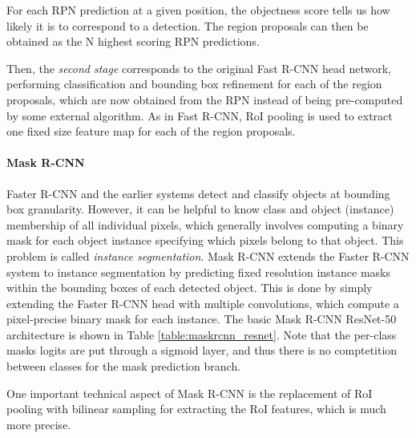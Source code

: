 For each RPN prediction at a given position, the objectness score tells us how likely it is to correspond to a detection.
The region proposals can then be obtained as the N highest scoring RPN predictions.

Then, the \emph{second stage} corresponds to the original Fast R-CNN head network, performing classification
and bounding box refinement for each of the region proposals, which are now obtained
from the RPN instead of being pre-computed by some external algorithm.
As in Fast R-CNN, RoI pooling is used to extract one fixed size feature map for each of the region proposals.

\paragraph{Mask R-CNN}
Faster R-CNN and the earlier systems detect and classify objects at bounding box granularity.
However, it can be helpful to know class and object (instance) membership of all individual pixels,
which generally involves computing a binary mask for each object instance specifying which pixels belong
to that object. This problem is called \emph{instance segmentation}.
Mask R-CNN \cite{MaskRCNN} extends the Faster R-CNN system to instance segmentation by predicting
fixed resolution instance masks within the bounding boxes of each detected object.
This is done by simply extending the Faster R-CNN head with multiple convolutions, which
compute a pixel-precise binary mask for each instance.
The basic Mask R-CNN ResNet-50 architecture is shown in Table \ref{table:maskrcnn_resnet}.
Note that the per-class masks logits are put through a sigmoid layer, and thus there is no
comptetition between classes for the mask prediction branch.

One important technical aspect of Mask R-CNN is the replacement of RoI pooling with
bilinear sampling for extracting the RoI features, which is much more precise.


